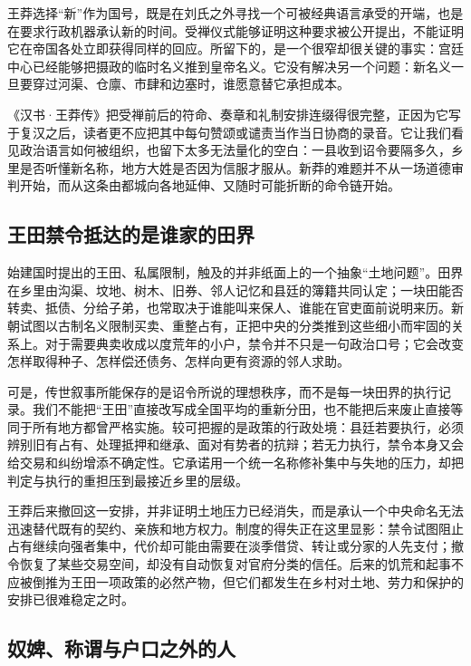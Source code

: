 王莽选择“新”作为国号，既是在刘氏之外寻找一个可被经典语言承受的开端，也是在要求行政机器承认新的时间。受禅仪式能够证明这种要求被公开提出，不能证明它在帝国各处立即获得同样的回应。所留下的，是一个很窄却很关键的事实：宫廷中心已经能够把摄政的临时名义推到皇帝名义。它没有解决另一个问题：新名义一旦要穿过河渠、仓廪、市肆和边塞时，谁愿意替它承担成本。

《汉书·王莽传》把受禅前后的符命、奏章和礼制安排连缀得很完整，正因为它写于复汉之后，读者更不应把其中每句赞颂或谴责当作当日协商的录音。它让我们看见政治语言如何被组织，也留下太多无法量化的空白：一县收到诏令要隔多久，乡里是否听懂新名称，地方大姓是否因为信服才服从。新莽的难题并不从一场道德审判开始，而从这条由都城向各地延伸、又随时可能折断的命令链开始。

\subsection{王田禁令抵达的是谁家的田界}

始建国时提出的王田、私属限制，触及的并非纸面上的一个抽象“土地问题”。田界在乡里由沟渠、坟地、树木、旧券、邻人记忆和县廷的簿籍共同认定；一块田能否转卖、抵债、分给子弟，也常取决于谁能叫来保人、谁能在官吏面前说明来历。新朝试图以古制名义限制买卖、重整占有，正把中央的分类推到这些细小而牢固的关系上。对于需要典卖收成以度荒年的小户，禁令并不只是一句政治口号；它会改变怎样取得种子、怎样偿还债务、怎样向更有资源的邻人求助。

可是，传世叙事所能保存的是诏令所说的理想秩序，而不是每一块田界的执行记录。我们不能把“王田”直接改写成全国平均的重新分田，也不能把后来废止直接等同于所有地方都曾严格实施。较可把握的是政策的行政处境：县廷若要执行，必须辨别旧有占有、处理抵押和继承、面对有势者的抗辩；若无力执行，禁令本身又会给交易和纠纷增添不确定性。它承诺用一个统一名称修补集中与失地的压力，却把判定与执行的重担压到最接近乡里的层级。

王莽后来撤回这一安排，并非证明土地压力已经消失，而是承认一个中央命名无法迅速替代既有的契约、亲族和地方权力。制度的得失正在这里显影：禁令试图阻止占有继续向强者集中，代价却可能由需要在淡季借贷、转让或分家的人先支付；撤令恢复了某些交易空间，却没有自动恢复对官府分类的信任。后来的饥荒和起事不应被倒推为王田一项政策的必然产物，但它们都发生在乡村对土地、劳力和保护的安排已很难稳定之时。

\subsection{奴婢、称谓与户口之外的人}

